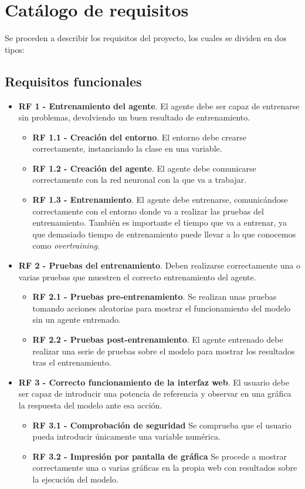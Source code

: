 \section{Catálogo de requisitos}

Se proceden a describir los requisitos del proyecto, los cuales se dividen en dos tipos:

\subsection{Requisitos funcionales}

\begin{itemize}
    \item \textbf{RF 1 - Entrenamiento del agente}. El agente debe ser capaz de entrenarse sin problemas, devolviendo un buen resultado de entrenamiento.
    \begin{itemize}
        \item \textbf{RF 1.1 - Creación del entorno}. El entorno debe crearse correctamente, instanciando la clase en una variable.
        \item \textbf{RF 1.2 - Creación del agente}. El agente debe comunicarse correctamente con la red neuronal con la que va a trabajar.
        \item \textbf{RF 1.3 - Entrenamiento}. El agente debe entrenarse, comunicándose correctamente con el entorno donde va a realizar las pruebas del entrenamiento. También es importante el tiempo que va a entrenar, ya que demasiado tiempo de entrenamiento puede llevar a lo que conocemos como \textit{overtraining}\cite{overtraining}.
    \end{itemize}
    \item \textbf{RF 2 - Pruebas del entrenamiento}. Deben realizarse correctamente una o varias pruebas que muestren el correcto entrenamiento del agente.
    \begin{itemize}
        \item \textbf{RF 2.1 - Pruebas pre-entrenamiento}. Se realizan unas pruebas tomando acciones aleatorias para mostrar el funcionamiento del modelo sin un agente entrenado.
        \item \textbf{RF 2.2 - Pruebas post-entrenamiento}. El agente entrenado debe realizar una serie de pruebas sobre el modelo para mostrar los resultados tras el entrenamiento.
    \end{itemize}
    \item \textbf{RF 3 - Correcto funcionamiento de la interfaz web}. El usuario debe ser capaz de introducir una potencia de referencia y observar en una gráfica la respuesta del modelo ante esa acción.
    \begin{itemize}
        \item \textbf{RF 3.1 - Comprobación de seguridad} Se comprueba que el usuario pueda introducir únicamente una variable numérica.
        \item \textbf{RF 3.2 - Impresión por pantalla de gráfica} Se procede a mostrar correctamente una o varias gráficas en la propia web con resultados sobre la ejecución del modelo.
    \end{itemize}
\end{itemize}

